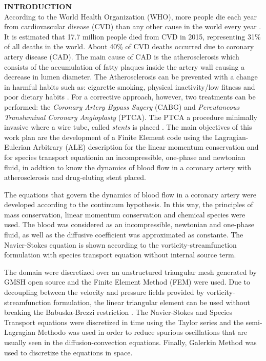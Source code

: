 \noindent\textbf{INTRODUCTION}
\\

According to the World Health Organization (WHO), more people die each year from cardiovascular disease (CVD) than any other cause in the world every year \cite{oms2017}.
It is estimated that 17.7 million people died from CVD in 2015,
representing 31\% of all deaths in the world. About 40\% of CVD deaths
occurred due to coronary artery disease (CAD). 
The main cause of CAD is the atherosclerosis which consists of
the accumulation of fatty plaques inside the artery wall causing
a decrease in lumen diameter.
The Atherosclerosis can be prevented with a change in harmful habits
such as: cigarette smoking, physical inactivity/low fitness and poor dietary habits \cite{spring2013}.
For a corrective approach, however, two treatments can be performed:
the \textit{Coronary Artery Bypass Sugery} (CABG) and
\textit{Percutaneous Transluminal Coronary Angioplasty} (PTCA).
The PTCA a procedure minimally invasive where a wire tube,
called \textit{stents} is placed \cite{sigward1987}.
The main objectives of this work plan are the development of a
Finite Element code using the Lagragian-Eulerian Arbitrary (ALE) description for the linear momentum conservation and for species transport equationin an incompressible, one-phase and newtonian fluid, in addtion to know the dynamics of blood flow in a coronary artery with atherosclerosis and drug-eluting stent placed.

\medskip
The equations that govern the dynamics of blood flow in a coronary artery were developed according to the continuum hypothesis.
In this way, the principles of mass conservation, linear momentum conservation and chemical species were used.
The blood was considered as an incompressible, newtonian and one-phase fluid, as well as the diffusive coefficient was approximated as constante.
The Navier-Stokes equation is shown according to the vorticity-streamfunction formulation with species transport equation without internal source term.

\medskip
The domain were discretized over an unstructured triangular mesh generated by GMSH open source \cite{gmsh} and the Finite Element Method (FEM) were used. 
Due to decoupling between the velocity and pressure fields provided by vorticity-streamfunction formulation, the linear triangular element can be used without breaking the Babuska-Brezzi restriction \cite{babuska1971}\cite{brezzi1974}.
The Navier-Stokes and Species Transport equations were discretized in time using the Taylor series and the semi-Lagragian Methodo \cite{pironneau198} was used in order to reduce spurious oscillations that are usually seen in the diffusion-convection equations. Finally, Galerkin Method was used to discretize the equations in space. 


